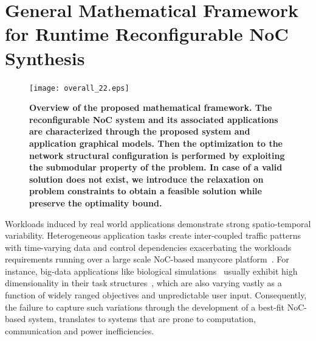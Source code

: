 \chapter{General Mathematical Framework for Runtime Reconfigurable NoC Synthesis}
\label{cha:ch6}
  \begin{figure}%
  \centering
  \texttt{[image: overall\_22.eps]}
  \vskip -1mm
  \caption{\textbf{Overview of the proposed mathematical framework. The reconfigurable NoC system and its associated applications  are characterized through the proposed system and application graphical models. Then the optimization to the network structural configuration is performed by exploiting the submodular property of the problem. In case of a valid solution does not exist, we introduce the relaxation on problem constraints to obtain a feasible solution while preserve the optimality bound.  } }
  \label{fig:concept}
  \vskip -7mm
\end{figure}

\noindent Workloads induced by real world applications demonstrate strong spatio-temporal variability. Heterogeneous application tasks create inter-coupled traffic patterns with time-varying data and control dependencies exacerbating the workloads requirements running over a large scale NoC-based manycore platform~\cite{bogdan2015mathematical}. For instance, big-data applications like biological simulations~\cite{xue2014disease} usually exhibit high dimensionality in their task structures~\cite{xue_NOCS2014_paper}, which are also varying vastly as a function of widely ranged objectives and unpredictable user input. Consequently, the failure to capture such variations through the development of a best-fit NoC-based system, translates to systems that are prone to computation, communication and power inefficiencies.

